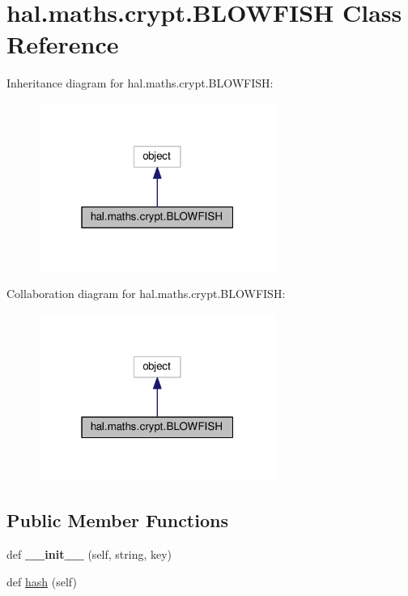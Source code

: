 \hypertarget{classhal_1_1maths_1_1crypt_1_1_b_l_o_w_f_i_s_h}{}\section{hal.\+maths.\+crypt.\+B\+L\+O\+W\+F\+I\+SH Class Reference}
\label{classhal_1_1maths_1_1crypt_1_1_b_l_o_w_f_i_s_h}


Inheritance diagram for hal.\+maths.\+crypt.\+B\+L\+O\+W\+F\+I\+SH\+:\nopagebreak
\begin{figure}[H]
\begin{center}
\leavevmode
\includegraphics[width=220pt]{classhal_1_1maths_1_1crypt_1_1_b_l_o_w_f_i_s_h__inherit__graph}
\end{center}
\end{figure}


Collaboration diagram for hal.\+maths.\+crypt.\+B\+L\+O\+W\+F\+I\+SH\+:\nopagebreak
\begin{figure}[H]
\begin{center}
\leavevmode
\includegraphics[width=220pt]{classhal_1_1maths_1_1crypt_1_1_b_l_o_w_f_i_s_h__coll__graph}
\end{center}
\end{figure}
\subsection*{Public Member Functions}
\begin{DoxyCompactItemize}
\item 
def {\bfseries \+\_\+\+\_\+init\+\_\+\+\_\+} (self, string, key)\hypertarget{classhal_1_1maths_1_1crypt_1_1_b_l_o_w_f_i_s_h_a0428f1f9b864c84c1911d61235e739fc}{}\label{classhal_1_1maths_1_1crypt_1_1_b_l_o_w_f_i_s_h_a0428f1f9b864c84c1911d61235e739fc}

\item 
def \hyperlink{classhal_1_1maths_1_1crypt_1_1_b_l_o_w_f_i_s_h_a7581e9c15acfe4cb64c88c215193f65a}{hash} (self)
\end{DoxyCompactItemize}
